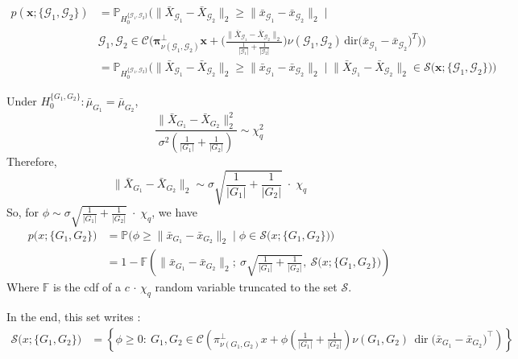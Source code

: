\documentclass[11pt,a4paper]{article}
\begin{document}
\begin{align*}
p(\mathbf{x}; \{\mathcal{G}_1,\mathcal{G}_2\})
&= \mathbb{P}_{H_0^{\{\mathcal{G}_1,\mathcal{G}_2\}}}\Bigg(
\big\|\bar X_{\mathcal{G}_1} - \bar X_{\mathcal{G}_2}\big\|_2 \ge \big\|\bar x_{\mathcal{G}_1} - \bar x_{\mathcal{G}_2}\big\|_2
\;\Bigg|\; \\
&\mathcal{G}_1,\mathcal{G}_2 \in \mathcal{C}\Bigg(
\boldsymbol{\pi}^{\perp}_{\nu(\mathcal{G}_1,\mathcal{G}_2)}\mathbf{x}
+ \Bigg(\frac{\big\|\bar X_{\mathcal{G}_1} - \bar X_{\mathcal{G}_2}\big\|_2}{\frac{1}{|\mathcal{G}_1|}+\frac{1}{|\mathcal{G}_2|}}\Bigg)
\nu(\mathcal{G}_1,\mathcal{G}_2)\,\mathrm{dir}\big(\bar x_{\mathcal{G}_1} - \bar x_{\mathcal{G}_2}\big)^{T}
\Bigg)\Bigg) \\
&= \mathbb{P}_{H_0^{\{\mathcal{G}_1,\mathcal{G}_2\}}}\Bigg(
\big\|\bar X_{\mathcal{G}_1} - \bar X_{\mathcal{G}_2}\big\|_2 \ge \big\|\bar x_{\mathcal{G}_1} - \bar x_{\mathcal{G}_2}\big\|_2
\;\Bigg|\;
\big\|\bar X_{\mathcal{G}_1} - \bar X_{\mathcal{G}_2}\big\|_2 \in \mathcal{S}\big(\mathbf{x}; \{\mathcal{G}_1,\mathcal{G}_2\}\big)
\Bigg)
\end{align*}

Under $H_0^{\{G_1,G_2\}} : \bar\mu_{G_1} = \bar\mu_{G_2}$,
\[
\frac{\big\|\bar X_{G_1} - \bar X_{G_2}\big\|_2^2}{\sigma^2\left(\frac{1}{|G_1|} + \frac{1}{|G_2|}\right)} \sim \chi^2_q
\]
Therefore,
\[
\big\|\bar X_{G_1} - \bar X_{G_2}\big\|_2 \sim \sigma\sqrt{\frac{1}{|G_1|} + \frac{1}{|G_2|}}\;\cdot\;\chi_q
\]
So, for $\phi \sim \sigma\sqrt{\frac{1}{|G_1|} + \frac{1}{|G_2|}}\;\cdot\;\chi_q$, we have
\begin{align*}
p\big(x; \{G_1,G_2\}\big)
&= \mathbb{P}\Big(\phi \ge \big\|\bar x_{G_1} - \bar x_{G_2}\big\|_2 \;\Big|\; \phi \in \mathcal{S}\big(x; \{G_1,G_2\}\big)\Big) \\
&= 1 - \mathbb{F}\!\left(\big\|\bar x_{G_1} - \bar x_{G_2}\big\|_2;\ \sigma\sqrt{\frac{1}{|G_1|} + \frac{1}{|G_2|}},\ \mathcal{S}\big(x; \{G_1,G_2\}\big)\right)
\end{align*}
Where $\mathbb{F}$ is the cdf of a $c \, \cdot \, \chi_q$ random variable truncated to the set $\mathcal{S}$.

In the end, this set writes :
\begin{align*}
    \mathcal{S}\big(x; \{G_1,G_2\}\big) &= \left\{ \phi \ge 0 :\ G_1, G_2 \in \mathcal{C}\!\left( \pi^{\perp}_{\nu(G_1,G_2)} x + \phi \left(\tfrac{1}{|G_1|} + \tfrac{1}{|G_2|}\right)\nu(G_1,G_2)\, \operatorname{dir}\big(\bar x_{G_1} - \bar x_{G_2}\big)^{\!\top} \right) \right\}
\end{align*}
\end{document}
